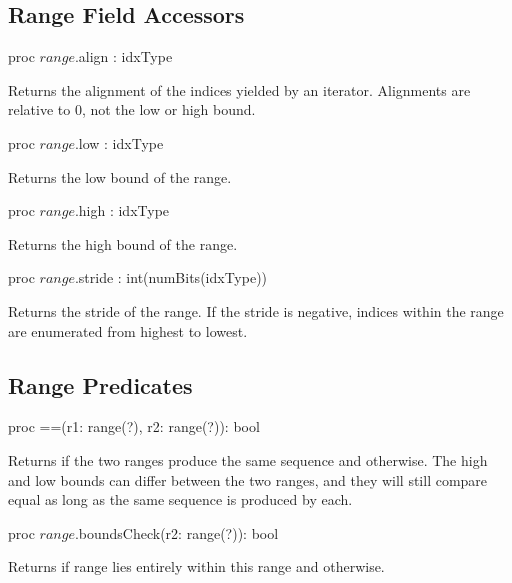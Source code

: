 \subsection{Range Field Accessors}

\begin{protohead}
proc $range$.align : idxType
\end{protohead}
\begin{protobody}
Returns the alignment of the indices yielded by an iterator.  Alignments are
relative to 0, not the low or high bound.
\end{protobody}

\begin{protohead}
proc $range$.low : idxType
\end{protohead}
\begin{protobody}
Returns the low bound of the range.
\end{protobody}

\begin{protohead}
proc $range$.high : idxType
\end{protohead}
\begin{protobody}
Returns the high bound of the range.
\end{protobody}

\begin{protohead}
proc $range$.stride : int(numBits(idxType))
\end{protohead}
\begin{protobody}
Returns the stride of the range.  If the stride is negative, indices within the
range are enumerated from highest to lowest.
\end{protobody}

\subsection{Range Predicates}

\begin{protohead}
proc ==(r1: range(?), r2: range(?)): bool
\end{protohead}
\begin{protobody}
Returns  if the two ranges produce the same sequence
and  otherwise.  The high and low bounds can differ between the two
ranges, and they will still compare equal as long as the same sequence is
produced by each.
\end{protobody}

\begin{protohead}
proc $range$.boundsCheck(r2: range(?)): bool
\end{protohead}
\begin{protobody}
Returns  if range  lies entirely within this range
and  otherwise.  
\end{protobody}


